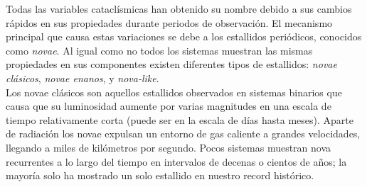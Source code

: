 Todas las variables cataclísmicas han obtenido su nombre debido a sus cambios rápidos en sus propiedades durante periodos de observación. El mecanismo principal que causa estas variaciones se debe a los estallidos periódicos, conocidos como \textit{novae}. Al igual como no todos los sistemas muestran las mismas propiedades en sus componentes existen diferentes tipos de estallidos: \textit{novae clásicos}, \textit{novae enanos}, y \textit{nova-like}. \cite*{smithReview} 
\\\newline
Los novae clásicos son aquellos estallidos observados en sistemas binarios que causa que su luminosidad aumente por varias magnitudes en una escala de tiempo relativamente corta (puede ser en la escala de días hasta meses). \cite*{smithReview} Aparte de radiación los novae expulsan un entorno de gas caliente a grandes velocidades, llegando a miles de kilómetros por segundo. Pocos sistemas muestran nova recurrentes a lo largo del tiempo en intervalos de decenas o cientos de años; la mayoría solo ha mostrado un solo estallido en nuestro record histórico. 